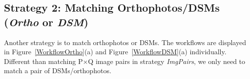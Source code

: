 \subsection{Strategy 2: Matching Orthophotos/DSMs (\textit{Ortho} or \textit{DSM})}
Another strategy is to match orthophotos or DSMs. %
The workflows are displayed in Figure~\ref{WorkflowOrtho}(a) and Figure~\ref{WorkflowDSM}(a) individually. Different than matching P$\times$Q image pairs in strategy \textit{ImgPairs}, we only need to match a pair of DSMs/orthophotos. 
\begin{figure}[htbp]
    \begin{center}
\end{center}
\end{figure}
